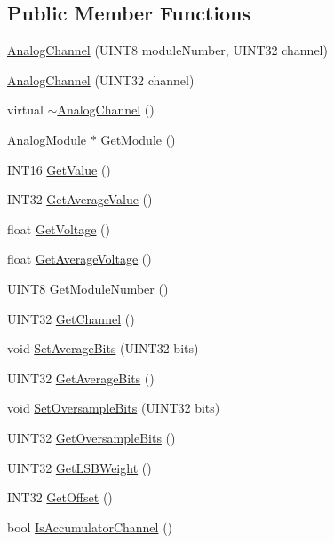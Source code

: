 \subsection*{Public Member Functions}
\begin{DoxyCompactItemize}
\item 
\hyperlink{classAnalogChannel_a8928766b0b7a5f5010acb5deb354f8f3}{AnalogChannel} (UINT8 moduleNumber, UINT32 channel)
\item 
\hyperlink{classAnalogChannel_a9596b1752bb22dcb1295c2158042ec76}{AnalogChannel} (UINT32 channel)
\item 
virtual \hyperlink{classAnalogChannel_aab41f5e25b1a9a8fa1b935783dcc89a1}{$\sim$AnalogChannel} ()
\item 
\hyperlink{classAnalogModule}{AnalogModule} $\ast$ \hyperlink{classAnalogChannel_aa8c8f0328ba7a4074d0f8c8fe8738327}{GetModule} ()
\item 
INT16 \hyperlink{classAnalogChannel_ab9d814ee9f311c6beb2b379e60aee79a}{GetValue} ()
\item 
INT32 \hyperlink{classAnalogChannel_a35dda9856d45c0fe807337ab3678b212}{GetAverageValue} ()
\item 
float \hyperlink{classAnalogChannel_a8032c882a142a01c43ea16c817fc2290}{GetVoltage} ()
\item 
float \hyperlink{classAnalogChannel_aba0ed352ce011170556c039c939f8731}{GetAverageVoltage} ()
\item 
UINT8 \hyperlink{classAnalogChannel_a5731d3c308e74c9011b81238aedcbd0e}{GetModuleNumber} ()
\item 
UINT32 \hyperlink{classAnalogChannel_a5d191a8fb04536a9c20355e6e5b97262}{GetChannel} ()
\item 
void \hyperlink{classAnalogChannel_a64da26075ace6b51c635ed4b0646742b}{SetAverageBits} (UINT32 bits)
\item 
UINT32 \hyperlink{classAnalogChannel_ab73e958a37fece26e7dd9fd3c358684e}{GetAverageBits} ()
\item 
void \hyperlink{classAnalogChannel_a69c5b8dd70a0a5792f2522b2b4758fc3}{SetOversampleBits} (UINT32 bits)
\item 
UINT32 \hyperlink{classAnalogChannel_ae7ddc6516b2ecba8d1e9b9abab9a5939}{GetOversampleBits} ()
\item 
UINT32 \hyperlink{classAnalogChannel_a6a491e56a5d92d4400bf7bde40eda2cc}{GetLSBWeight} ()
\item 
INT32 \hyperlink{classAnalogChannel_a0e2d698faf502d341f16cadad26e39fd}{GetOffset} ()
\item 
bool \hyperlink{classAnalogChannel_a6915bcc0cb08e270812f31fdf7aa6caa}{IsAccumulatorChannel} ()

\end{DoxyCompactItemize}
